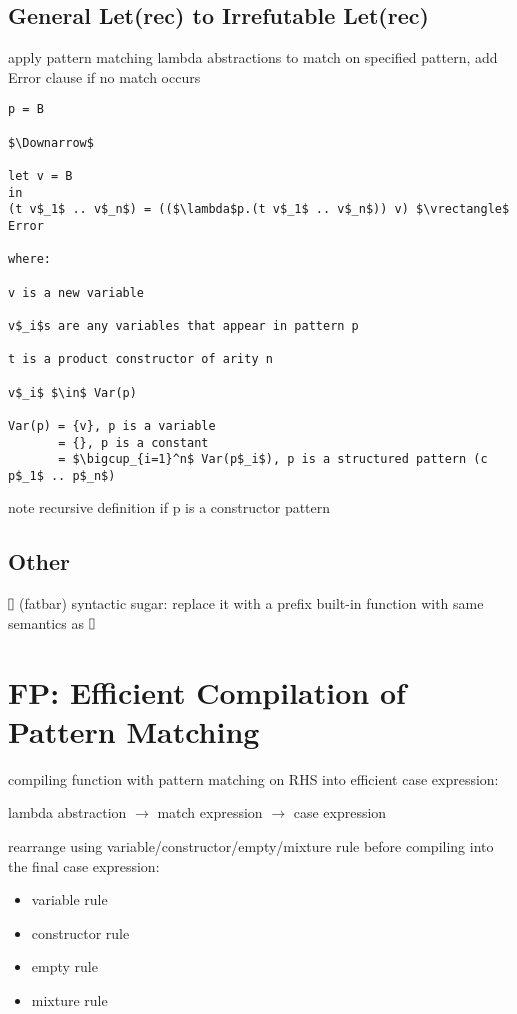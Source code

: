 \documentclass[8pt]{extarticle}
\newcommand*{\vrectangle}{{\setlength{\fboxsep}{0pt}\fbox{\phantom{l}}}}
\begin{document}
\begin{multicols*}{2}
\begin{lstlisting}
\end{lstlisting}
  
  \subsection{General Let(rec) to Irrefutable Let(rec)}

  apply pattern matching lambda abstractions to match on specified pattern, add Error clause if no match occurs

  \begin{lstlisting}
p = B

$\Downarrow$

let v = B
in
(t v$_1$ .. v$_n$) = (($\lambda$p.(t v$_1$ .. v$_n$)) v) $\vrectangle$ Error

where:

v is a new variable

v$_i$s are any variables that appear in pattern p

t is a product constructor of arity n

v$_i$ $\in$ Var(p)

Var(p) = {v}, p is a variable
       = {}, p is a constant
       = $\bigcup_{i=1}^n$ Var(p$_i$), p is a structured pattern (c p$_1$ .. p$_n$)
  \end{lstlisting}

  note recursive definition if p is a constructor pattern

  \subsection{Other}

  $\vrectangle$ (fatbar) syntactic sugar: replace it with a prefix built-in function with same semantics as $\vrectangle$
  
  \vfill\null
  \columnbreak
  
  \section{FP: Efficient Compilation of Pattern Matching}
  
  compiling function with pattern matching on RHS into efficient case expression:
  
  lambda abstraction $\rightarrow$ match expression $\rightarrow$ case expression

  rearrange using variable/constructor/empty/mixture rule before compiling into the final case expression:
  \begin{itemize}
  \item variable rule
  \item constructor rule
  \item empty rule
  \item mixture rule
  \end{itemize}


\end{multicols*}
\end{document}
